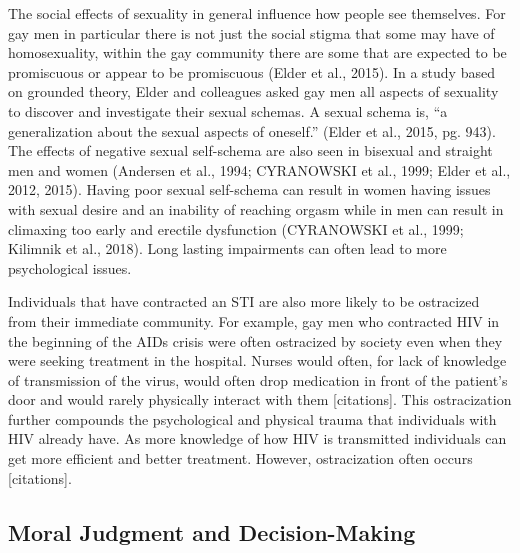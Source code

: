 \documentclass[
  donotrepeattitle,doc, 12pt, a4paper,floatsintext]{apa7}
\begin{document}
The social effects of sexuality in general influence how people see themselves. For gay men in particular there is not just the social stigma that some may have of homosexuality, within the gay community there are some that are expected to be promiscuous or appear to be promiscuous (Elder et al., 2015). In a study based on grounded theory, Elder and colleagues asked gay men all aspects of sexuality to discover and investigate their sexual schemas. A sexual schema is, ``a generalization about the sexual aspects of oneself.'' (Elder et al., 2015, pg. 943). The effects of negative sexual self-schema are also seen in bisexual and straight men and women (Andersen et al., 1994; CYRANOWSKI et al., 1999; Elder et al., 2012, 2015). Having poor sexual self-schema can result in women having issues with sexual desire and an inability of reaching orgasm while in men can result in climaxing too early and erectile dysfunction (CYRANOWSKI et al., 1999; Kilimnik et al., 2018). Long lasting impairments can often lead to more psychological issues.

Individuals that have contracted an STI are also more likely to be ostracized from their immediate community. For example, gay men who contracted HIV in the beginning of the AIDs crisis were often ostracized by society even when they were seeking treatment in the hospital. Nurses would often, for lack of knowledge of transmission of the virus, would often drop medication in front of the patient's door and would rarely physically interact with them {[}citations{]}. This ostracization further compounds the psychological and physical trauma that individuals with HIV already have. As more knowledge of how HIV is transmitted individuals can get more efficient and better treatment. However, ostracization often occurs {[}citations{]}.

\hypertarget{moral-judgment-and-decision-making}{%
\subsection{Moral Judgment and Decision-Making}\label{moral-judgment-and-decision-making}}
\end{document}
